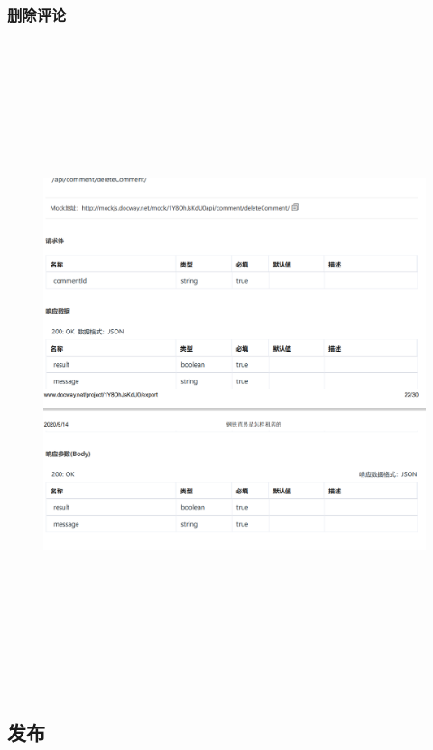         \subsubsection{删除评论} 
        \begin{figure}[h]
            \centering
            \includegraphics[height=19.0cm,width=14.0cm]{design/image/api24.png} 
            \end{figure}  
            \newpage  
            
        \subsection{发布}
     
